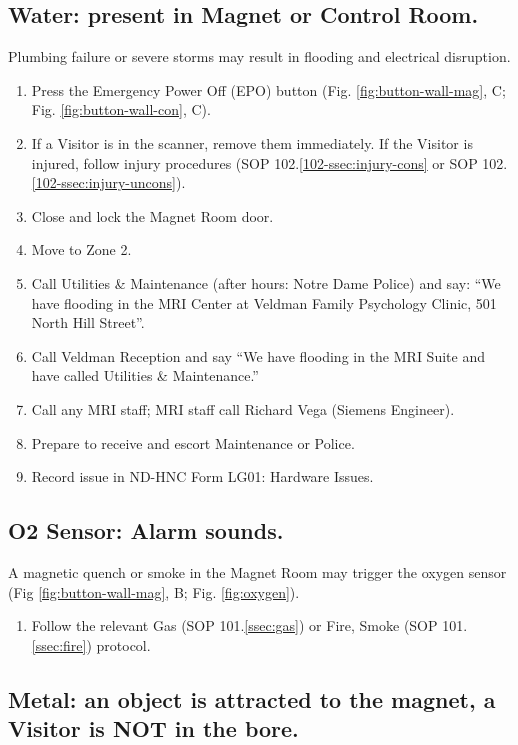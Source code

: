 \documentclass[11pt]{article}
\begin{document}
\subsection{Water: present in Magnet or Control Room.}
\label{ssec:water}

Plumbing failure or severe storms may result in flooding and electrical disruption.

\begin{enumerate}
	\item Press the Emergency Power Off (EPO) button (Fig. \ref{fig:button-wall-mag}, C; Fig. \ref{fig:button-wall-con}, C).
	\item If a Visitor is in the scanner, remove them immediately. If the Visitor is injured, follow injury procedures (SOP 102.\ref{102-ssec:injury-cons} or SOP 102.\ref{102-ssec:injury-uncons}).
	\item Close and lock the Magnet Room door.
	\item Move to Zone 2.
	\item Call Utilities \& Maintenance (after hours: Notre Dame Police) and say: ``We have flooding in the MRI Center at Veldman Family Psychology Clinic, 501 North Hill Street''.
	\item Call Veldman Reception and say ``We have flooding in the MRI Suite and have called Utilities \& Maintenance.''
	\item Call any MRI staff; MRI staff call Richard Vega (Siemens Engineer).
	\item Prepare to receive and escort Maintenance or Police.
	\item Record issue in ND-HNC Form LG01: Hardware Issues.
\end{enumerate}


\subsection{O2 Sensor: Alarm sounds.}
\label{ssec:oxygen}

A magnetic quench or smoke in the Magnet Room may trigger the oxygen sensor (Fig \ref{fig:button-wall-mag}, B; Fig. \ref{fig:oxygen}).

\begin{enumerate}
	\item Follow the relevant Gas (SOP 101.\ref{ssec:gas}) or Fire, Smoke (SOP 101.\ref{ssec:fire}) protocol.
\end{enumerate}


\subsection{Metal: an object is attracted to the magnet, a Visitor is NOT in the bore.}
\label{ssec:metal-no-subj}
\end{document}
